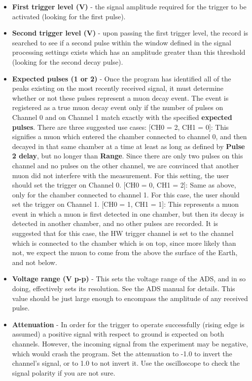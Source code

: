 \documentclass{../lab}
\begin{document}
\begin{itemize}
    \item \textbf{First trigger level (V)} - the signal amplitude required for the trigger to be activated (looking for the first pulse).
    \item \textbf{Second trigger level (V) }- upon passing the first trigger level, the record is searched to see if a second pulse within the window defined in the signal processing settings exists which has an amplitude greater than this threshold (looking for the second decay pulse).
    \item \textbf{Expected pulses (1 or 2)} - Once the program has identified all of the peaks existing on the most recently received signal, it must determine whether or not these pulses represent a muon decay event. The event is registered as a true muon decay event only if the number of pulses on Channel 0 and on Channel 1 match exactly with the specified \textbf{expected pulses}. There are three suggested use cases: [CH0 = 2, CH1 = 0]: This signifies a muon which entered the chamber connected to channel 0, and then decayed in that same chamber at a time at least as long as defined by \textbf{Pulse 2 delay}, but no longer than \textbf{Range}. Since there are only two pulses on this channel and no pulses on the other channel, we are convinced that another muon did not interfere with the measurement. For this setting, the user should set the trigger on Channel 0. [CH0 = 0, CH1 = 2]: Same as above, only for the chamber connected to channel 1. For this case, the user should set the trigger on Channel 1. [CH0 = 1, CH1 = 1]: This represents a muon event in which a muon is first detected in one chamber, but then its decay is detected in another chamber, and no other pulses are recorded. It is suggested that for this case, the HW trigger channel is set to the channel which is connected to the chamber which is on top, since more likely than not, we expect the muon to come from the above the surface of the Earth, and not below.
    \item \textbf{Voltage range (V p-p)} - This sets the voltage range of the ADS, and in so doing, effectively sets its resolution. See the ADS manual for details. This value should be just large enough to encompass the amplitude of any received pulse.
    \item \textbf{Attenuation} - In order for the trigger to operate successfully (rising edge is assumed) a positive signal with respect to ground is expected on both channels. However, the incoming signal from the experiment may be negative, which would crash the program. Set the attenuation to -1.0 to invert the channel's signal, or to 1.0 to not invert it. Use the oscilloscope to check the signal polarity if you are not sure.
\end{itemize}
\end{document}
